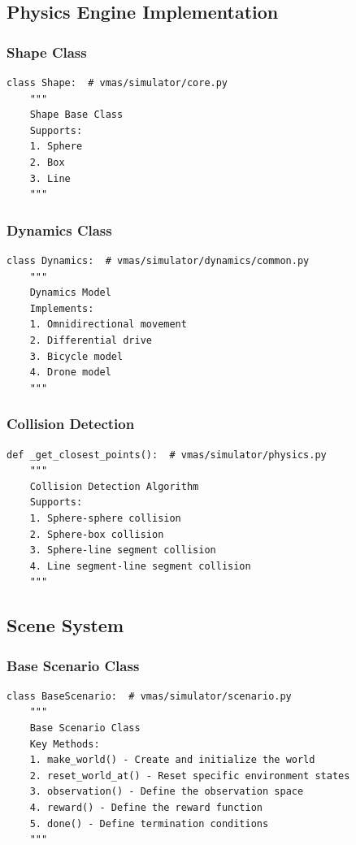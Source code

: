 \documentclass[12pt]{article}
\begin{document}
\subsection{Physics Engine Implementation}

\subsubsection{Shape Class}
\begin{verbatim}
class Shape:  # vmas/simulator/core.py
    """
    Shape Base Class
    Supports:
    1. Sphere
    2. Box
    3. Line
    """
\end{verbatim}

\subsubsection{Dynamics Class}
\begin{verbatim}
class Dynamics:  # vmas/simulator/dynamics/common.py
    """
    Dynamics Model
    Implements:
    1. Omnidirectional movement
    2. Differential drive
    3. Bicycle model
    4. Drone model
    """
\end{verbatim}

\subsubsection{Collision Detection}
\begin{verbatim}
def _get_closest_points():  # vmas/simulator/physics.py
    """
    Collision Detection Algorithm
    Supports:
    1. Sphere-sphere collision
    2. Sphere-box collision
    3. Sphere-line segment collision
    4. Line segment-line segment collision
    """
\end{verbatim}

\subsection{Scene System}

\subsubsection{Base Scenario Class}
\begin{verbatim}
class BaseScenario:  # vmas/simulator/scenario.py
    """
    Base Scenario Class
    Key Methods:
    1. make_world() - Create and initialize the world
    2. reset_world_at() - Reset specific environment states
    3. observation() - Define the observation space
    4. reward() - Define the reward function
    5. done() - Define termination conditions
    """
\end{verbatim}
\end{document}
